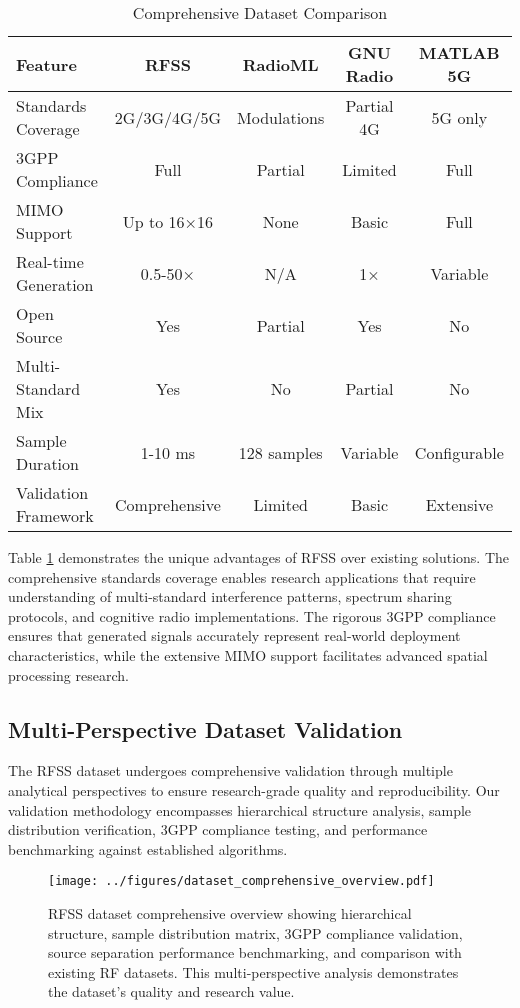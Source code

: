 \documentclass[twocolumn]{article}
\begin{document}
\begin{table}[h]
\centering
\caption{Comprehensive Dataset Comparison}
\label{tab:comparison}
\begin{tabular}{|l|c|c|c|c|}
\hline
\textbf{Feature} & \textbf{RFSS} & \textbf{RadioML} & \textbf{GNU Radio} & \textbf{MATLAB 5G} \\
\hline
Standards Coverage & 2G/3G/4G/5G & Modulations & Partial 4G & 5G only \\
\hline
3GPP Compliance & Full & Partial & Limited & Full \\
\hline
MIMO Support & Up to 16×16 & None & Basic & Full \\
\hline
Real-time Generation & 0.5-50× & N/A & 1× & Variable \\
\hline
Open Source & Yes & Partial & Yes & No \\
\hline
Multi-Standard Mix & Yes & No & Partial & No \\
\hline
Sample Duration & 1-10 ms & 128 samples & Variable & Configurable \\
\hline
Validation Framework & Comprehensive & Limited & Basic & Extensive \\
\hline
\end{tabular}
\end{table}

Table \ref{tab:comparison} demonstrates the unique advantages of RFSS over existing solutions. The comprehensive standards coverage enables research applications that require understanding of multi-standard interference patterns, spectrum sharing protocols, and cognitive radio implementations. The rigorous 3GPP compliance ensures that generated signals accurately represent real-world deployment characteristics, while the extensive MIMO support facilitates advanced spatial processing research.

\subsection{Multi-Perspective Dataset Validation}

The RFSS dataset undergoes comprehensive validation through multiple analytical perspectives to ensure research-grade quality and reproducibility. Our validation methodology encompasses hierarchical structure analysis, sample distribution verification, 3GPP compliance testing, and performance benchmarking against established algorithms.

\begin{figure}[h]
\centering
\texttt{[image: ../figures/dataset\_comprehensive\_overview.pdf]}
\caption{RFSS dataset comprehensive overview showing hierarchical structure, sample distribution matrix, 3GPP compliance validation, source separation performance benchmarking, and comparison with existing RF datasets. This multi-perspective analysis demonstrates the dataset's quality and research value.}
\label{fig:dataset_overview}
\end{figure}
\end{document}
